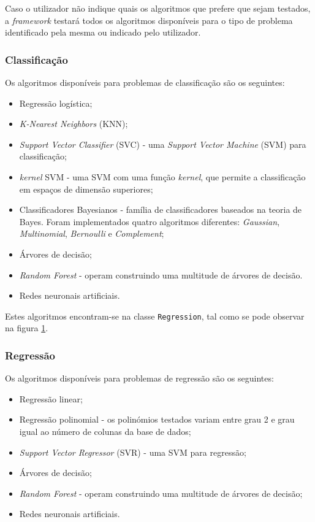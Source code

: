 \documentclass[a4paper]{report}
\begin{document}
{		Caso o utilizador não indique quais os algoritmos que prefere que sejam testados, a \textit{framework} testará todos os algoritmos disponíveis para o tipo de problema identificado pela mesma ou indicado pelo utilizador.
            
			\subsubsection{Classificação} \label{sssec:Classification1}
			Os algoritmos disponíveis para problemas de classificação são os seguintes:
			\begin{itemize}
				\item Regressão logística;
				\item \textit{K-Nearest Neighbors} (KNN);
				\item \textit{Support Vector Classifier} (SVC) - uma \textit{Support Vector Machine} (SVM) para classificação;
				\item \textit{kernel} SVM - uma SVM com uma função \textit{kernel}, que permite a classificação em espaços de dimensão superiores;
				\item Classificadores Bayesianos - família de classificadores baseados na teoria de Bayes. Foram implementados quatro algoritmos diferentes: \textit{Gaussian}, \textit{Multinomial}, \textit{Bernoulli} e \textit{Complement};
				\item Árvores de decisão;
				\item \textit{Random Forest} - operam construindo uma multitude de árvores de decisão.
				\item Redes neuronais artificiais.
			\end{itemize}

			Estes algoritmos encontram-se na classe \texttt{Regression}, tal como se pode observar na figura \hyperref[fig:1]{1}.

			\subsubsection{Regressão} \label{sssec:Regression1}
			Os algoritmos disponíveis para problemas de regressão são os seguintes:
			\begin{itemize}
				\item Regressão linear;
				\item Regressão polinomial - os polinómios testados variam entre grau 2 e grau igual ao número de colunas da base de dados;
				\item \textit{Support Vector Regressor} (SVR) - uma SVM para regressão;
				\item Árvores de decisão;
				\item \textit{Random Forest} - operam construindo uma multitude de árvores de decisão;
				\item Redes neuronais artificiais.
			\end{itemize}

}
\end{document}
